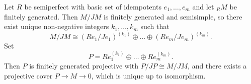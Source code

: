 Let $R$ be semiperfect with basic set of idempotents $e_1, \ldots, e_m$ and let ${}_R M$ be finitely generated. Then $M/JM$ is finitely generated and semisimple, so there exist unique non-negative integers $k_1, \ldots, k_m$ such that
$$M/JM \cong (R e_1/J e_1)^{(k_1)} \oplus \ldots \oplus (R e_m/J e_m)^{(k_m)}.$$
Set
$$P = R e_1^{(k_1)} \oplus \ldots \oplus R e_m^{(k_m)}.$$
Then $P$ is finitely generated projective with $P/JP \cong M/JM$, and there exists a projective cover $P \rightarrow M \rightarrow 0$, which is unique up to isomorphism.
